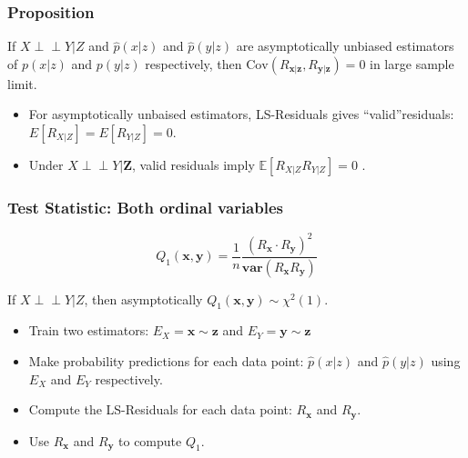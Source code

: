 \documentclass{beamer}
\def\ci{\perp\!\!\!\!\!\perp}
\begin{document}
\begin{frame}
	\frametitle{Proposition}
	If $ X \ci Y | Z $ and $ \hat{p}(x|z) $ and $ \hat{p}(y|z) $ are asymptotically
	unbiased estimators of $ p(x|z) $ and $ p(y|z) $ respectively, then 
	$ \mathrm{Cov}(R_{\bm{x}|\bm{z}}, R_{\bm{y}|\bm{z}}) = 0 $ in large sample limit.	
	\vspace{1em}

	\begin{itemize}
		\setlength\itemsep{1em}
		\item For asymptotically unbaised estimators, LS-Residuals
			gives ``valid''residuals: $ E[R_{X|Z}] = E[R_{Y|Z}] = 0
			$.
		\item Under $ X \ci Y | \bm{Z} $, valid
			residuals imply $ \mathbb{E}[R_{X|Z} R_{Y|Z}] = 0 $ \footnotemark.
	\end{itemize}
\end{frame}

\begin{frame}
	\frametitle{Test Statistic: Both ordinal variables}
	$$ Q_1(\bm{x}, \bm{y}) = \frac{1}{n} \frac{(R_{\bm{x}} \cdot R_{\bm{y}})^2}{\bm{var}(R_{\bm{x}} R_{\bm{y}})} $$

	If $ X \ci Y | Z $, then asymptotically $ Q_1(\bm{x}, \bm{y}) \sim \chi^2(1) $.

	\vspace{1em}
	\begin{itemize}
		\setlength\itemsep{1em}
		\item Train two estimators: $ E_X = \mathbf{x} \sim \mathbf{z} $ and $ E_Y = \mathbf{y} \sim \mathbf{z} $
		\item Make probability predictions for each data point: $ \hat{p}(x|z) $ and $ \hat{p}(y|z) $ using $ E_X $ and $ E_Y $ respectively.
		\item Compute the LS-Residuals for each data point: $ R_{\mathbf{x}} $ and $ R_{\mathbf{y}} $.
		\item Use $ R_{\mathbf{x}} $ and $ R_{\mathbf{y}} $ to compute $ Q_1 $.
	\end{itemize}

\end{frame}
\end{document}
